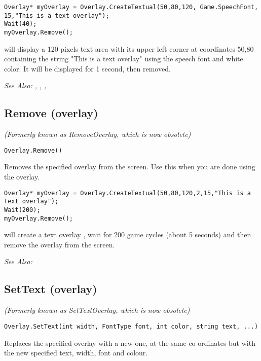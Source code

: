 \begin{verbatim}
Overlay* myOverlay = Overlay.CreateTextual(50,80,120, Game.SpeechFont, 15,"This is a text overlay");
Wait(40);
myOverlay.Remove();
\end{verbatim}
will display a 120 pixels text area with its upper left corner at coordinates 50,80
containing the string "This is a text overlay" using the speech font and white color.
It will be displayed for 1 second, then removed.

\it{See Also:} , ,
, 


\subsection{Remove (overlay)}\label{Overlay.Remove}%

\it{(Formerly known as RemoveOverlay, which is now obsolete)}

\begin{verbatim}
Overlay.Remove()
\end{verbatim}
Removes the specified overlay from the screen. Use this when you are
done using the overlay.

\begin{verbatim}
Overlay* myOverlay = Overlay.CreateTextual(50,80,120,2,15,"This is a text overlay");
Wait(200);
myOverlay.Remove();
\end{verbatim}
will create a text overlay , wait for 200 game cycles (about 5 seconds) and then
remove the overlay from the screen.

\it{See Also:} 


\subsection{SetText (overlay)}\label{Overlay.SetText}%

\it{(Formerly known as SetTextOverlay, which is now obsolete)}

\begin{verbatim}
Overlay.SetText(int width, FontType font, int color, string text, ...)
\end{verbatim}
Replaces the specified overlay with a new one, at the same co-ordinates but with
the new specified text, width, font and colour.

